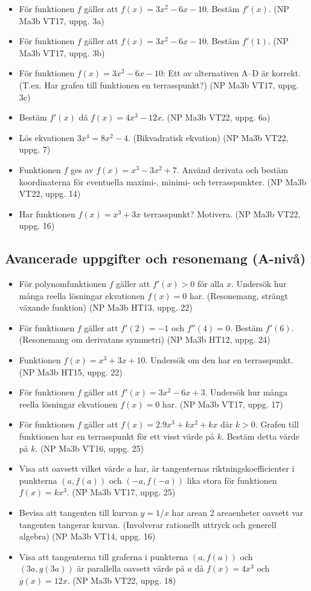 \documentclass{article}
\begin{document}
\begin{itemize}
    \item För funktionen $f$ gäller att $f(x) = 3x^2 - 6x - 10$. Bestäm $f'(x)$. (NP Ma3b VT17, uppg. 3a)
    \item För funktionen $f$ gäller att $f(x) = 3x^2 - 6x - 10$. Bestäm $f'(1)$. (NP Ma3b VT17, uppg. 3b)
    \item För funktionen $f(x) = 3x^2 - 6x - 10$: Ett av alternativen A–D är korrekt. (T.ex. Har grafen till funktionen en terrasspunkt?) (NP Ma3b VT17, uppg. 3c)
    \item Bestäm $f'(x)$ då $f(x) = 4x^3 - 12x$. (NP Ma3b VT22, uppg. 6a)
    \item Lös ekvationen $3x^4 = 8x^2 - 4$. (Bikvadratisk ekvation) (NP Ma3b VT22, uppg. 7)
    \item Funktionen $f$ ges av $f(x) = x^3 - 3x^2 + 7$. Använd derivata och bestäm koordinaterna för eventuella maximi-, minimi- och terrasspunkter. (NP Ma3b VT22, uppg. 14)
    \item Har funktionen $f(x) = x^3 + 3x$ terrasspunkt? Motivera. (NP Ma3b VT22, uppg. 16)
\end{itemize}

\subsection{Avancerade uppgifter och resonemang (A-nivå)}
\begin{itemize}
    \item För polynomfunktionen $f$ gäller att $f'(x) > 0$ för alla $x$. Undersök hur många reella lösningar ekvationen $f(x) = 0$ har. (Resonemang, strängt växande funktion) (NP Ma3b HT13, uppg. 22)
    \item För funktionen $f$ gäller att $f'(2)=-1$ och $f''(4)=0$. Bestäm $f'(6)$. (Resonemang om derivatans symmetri) (NP Ma3b HT12, uppg. 24)
    \item Funktionen $f(x) = x^3 + 3x + 10$. Undersök om den har en terrasspunkt. (NP Ma3b HT15, uppg. 22)
    \item För funktionen $f$ gäller att $f'(x) = 3x^2 - 6x + 3$. Undersök hur många reella lösningar ekvationen $f(x)=0$ har. (NP Ma3b VT17, uppg. 17)
    \item För funktionen $f$ gäller att $f(x) = 2.9x^3 + kx^2 + kx$ där $k>0$. Grafen till funktionen har en terrasspunkt för ett visst värde på $k$. Bestäm detta värde på $k$. (NP Ma3b VT16, uppg. 25)
    \item Visa att oavsett vilket värde $a$ har, är tangenternas riktningskoefficienter i punkterna $(a, f(a))$ och $(-a, f(-a))$ lika stora för funktionen $f(x) = kx^3$. (NP Ma3b VT17, uppg. 25)
    \item Bevisa att tangenten till kurvan $y=1/x$ har arean 2 areaenheter oavsett var tangenten tangerar kurvan. (Involverar rationellt uttryck och generell algebra) (NP Ma3b VT14, uppg. 16)
    \item Visa att tangenterna till graferna i punkterna $(a, f(a))$ och $(3a, g(3a))$ är parallella oavsett värde på $a$ då $f(x) = 4x^3$ och $g(x) = 12x$. (NP Ma3b VT22, uppg. 18)
\end{itemize}
\end{document}
